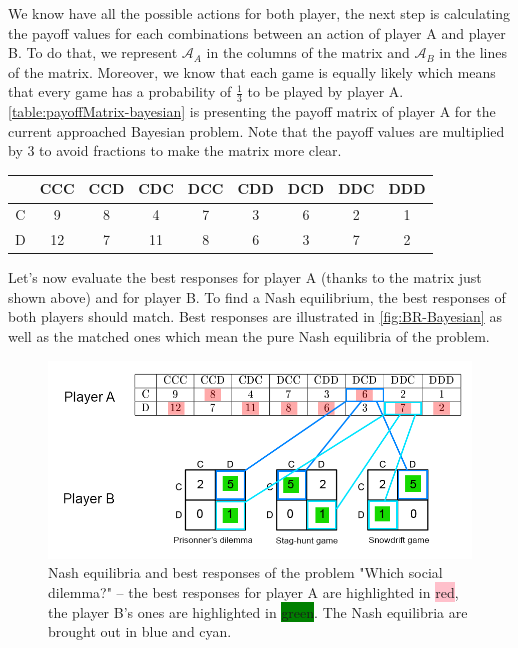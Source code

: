 \documentclass{article}
\begin{document}
We know have all the possible actions for both player, the next step is calculating the payoff values for each combinations between an action of player A and player B. To do that, we represent $\mathcal{A}_{A}$ in the columns of the matrix and $\mathcal{A}_{B}$ in the lines of the matrix. Moreover, we know that each game is equally likely which means that every game has a probability of $\frac{1}{3}$ to be played by player A. \autoref{table:payoffMatrix-bayesian} is presenting the payoff matrix of player A for the current approached Bayesian problem. Note that the payoff values are multiplied by 3 to avoid fractions to make the matrix more clear. \\

\begin{center}
\begin{tabular}{|c|c|c|c|c|c|c|c|c|}
  \hline
  			   & CCC & CCD & CDC & DCC & CDD & DCD & DDC & DDD \\
  \hline
  C & 9 & 8 & 4 & 7 & 3 & 6 & 2 & 1 \\
  \hline
  D & 12 & 7 & 11 & 8 & 6 & 3 & 7 & 2 \\
  \hline
\end{tabular}
\label{table:payoffMatrix-bayesian}
\end{center}

Let's now evaluate the best responses for player A (thanks to the matrix just shown above) and for player B. To find a Nash equilibrium, the best responses of both players should match. Best responses are illustrated in \autoref{fig:BR-Bayesian} as well as the matched ones which mean the pure Nash equilibria of the problem. 

\begin{figure}[h]
  \centering
  \includegraphics[scale=0.35]{figures/BR-Bayesian.png}
  \caption{Nash equilibria and best responses of the problem "Which social dilemma?" -- 
  the best responses for player A are highlighted in \colorbox{pink}{red}, the player B's ones are highlighted in \colorbox{green}{green}. The Nash equilibria are brought out in blue and cyan. }
  \label{fig:BR-Bayesian}
\end{figure}
\end{document}
